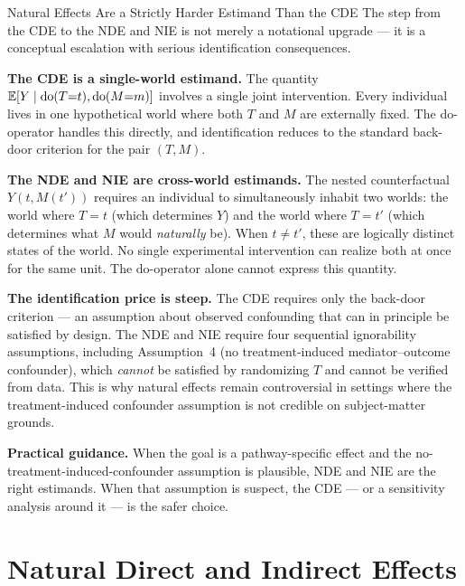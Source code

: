 \documentclass[master.tex]{subfiles}
\begin{document}
\begin{warn}{Natural Effects Are a Strictly Harder Estimand Than the CDE}
\label{w8:warn:crossworld}
The step from the CDE to the NDE and NIE is not merely a notational
upgrade --- it is a conceptual escalation with serious identification
consequences.

\medskip\noindent\textbf{The CDE is a single-world estimand.}  The
quantity $\mathbb{E}[Y \mid \mathrm{do}(T{=}t), \mathrm{do}(M{=}m)]$ involves a single
joint intervention.  Every individual lives in one hypothetical world
where both $T$ and $M$ are externally fixed.  The do-operator handles
this directly, and identification reduces to the standard back-door
criterion for the pair $(T, M)$.

\medskip\noindent\textbf{The NDE and NIE are cross-world estimands.}
The nested counterfactual $Y(t, M(t'))$ requires an individual to
simultaneously inhabit two worlds: the world where $T = t$ (which
determines $Y$) and the world where $T = t'$ (which determines what
$M$ would \emph{naturally} be).  When $t \neq t'$, these are logically
distinct states of the world.  No single experimental intervention can
realize both at once for the same unit.  The do-operator alone cannot
express this quantity.

\medskip\noindent\textbf{The identification price is steep.}  The CDE
requires only the back-door criterion --- an assumption about observed
confounding that can in principle be satisfied by design.  The NDE and
NIE require four sequential ignorability assumptions, including
Assumption~4 (no treatment-induced mediator--outcome confounder), which
\emph{cannot} be satisfied by randomizing $T$ and cannot be verified
from data.  This is why natural effects remain controversial in
settings where the treatment-induced confounder assumption is not
credible on subject-matter grounds.

\medskip\noindent\textbf{Practical guidance.}  When the goal is a
pathway-specific effect and the no-treatment-induced-confounder
assumption is plausible, NDE and NIE are the right estimands.  When
that assumption is suspect, the CDE --- or a sensitivity analysis
around it --- is the safer choice.
\end{warn}

\section{Natural Direct and Indirect Effects}
\label{w8:sec:nie}
\end{document}
